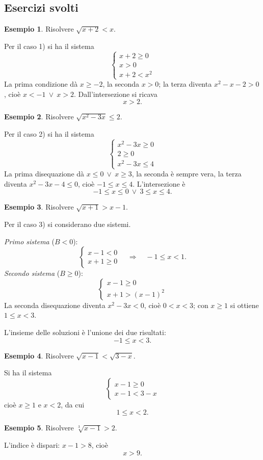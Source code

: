 \documentclass[12pt,a4paper,openany]{book}
\theoremstyle{definition}
\newtheorem{esempio}{Esempio}[section]
\theoremstyle{plain}
\theoremstyle{remark}
\newcommand{\sistema}[1]{\begin{cases}#1\end{cases}}
\begin{document}
\subsection*{Esercizi svolti}

\begin{esempio}
Risolvere $\sqrt{x+2}<x$.

Per il caso 1) si ha il sistema
\[
\sistema{x+2\ge 0\\ x>0\\ x+2<x^2}
\]
La prima condizione dà $x\ge -2$, la seconda $x>0$; la terza diventa $x^2-x-2>0$, cioè $x<-1\ \lor\ x>2$. Dall'intersezione si ricava
\[
x>2.
\]
\end{esempio}

\begin{esempio}
Risolvere $\sqrt{x^2-3x}\le 2$.

Per il caso 2) si ha il sistema
\[
\sistema{x^2-3x\ge 0\\ 2\ge 0\\ x^2-3x\le 4}
\]
La prima disequazione dà $x\le 0\ \lor\ x\ge 3$, la seconda è sempre vera, la terza diventa $x^2-3x-4\le 0$, cioè $-1\le x\le 4$. L'intersezione è
\[
-1\le x\le 0\ \lor\ 3\le x\le 4.
\]
\end{esempio}

\begin{esempio}
Risolvere $\sqrt{x+1}>x-1$.

Per il caso 3) si considerano due sistemi.

\emph{Primo sistema} ($B<0$):
\[
\sistema{x-1<0\\ x+1\ge 0}\quad\Longrightarrow\quad -1\le x<1.
\]
\emph{Secondo sistema} ($B\ge 0$):
\[
\sistema{x-1\ge 0\\ x+1>(x-1)^2}
\]
La seconda disequazione diventa $x^2-3x<0$, cioè $0<x<3$; con $x\ge 1$ si ottiene $1\le x<3$.

L'insieme delle soluzioni è l'unione dei due risultati:
\[
-1\le x<3.
\]
\end{esempio}

\begin{esempio}
Risolvere $\sqrt{x-1}<\sqrt{3-x}$.

Si ha il sistema
\[
\sistema{x-1\ge 0\\ x-1<3-x}
\]
cioè $x\ge 1$ e $x<2$, da cui
\[
1\le x<2.
\]
\end{esempio}

\begin{esempio}
Risolvere $\sqrt[3]{x-1}>2$.

L'indice è dispari: $x-1>8$, cioè
\[
x>9.
\]
\end{esempio}
\end{document}
